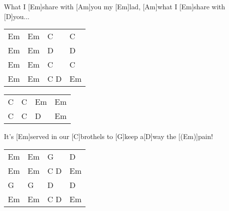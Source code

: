 \begin{guitar}
	[Am]What I [Em]share with [Am]you my [Em]lad, [Am]what I [Em]share with [D]you...
	
	{\footnotesize\begin{tabular}{|l|l|l|l|}
			Em & Em & C & C \\
			Em & Em & D & D \\
			Em & Em & C & C \\
			Em & Em & C D & Em 
	\end{tabular}} 

	{\footnotesize\begin{tabular}{|l|l|l|l|}
			C & C & Em & Em \\
			C & C & D & Em
	\end{tabular}} 
	
	\begin{highlightbar}
	 
	It's [Em]served in our [C]brothels to [G]keep a[D]way the [(Em)]pain! 
	\end{highlightbar}
	
	{\footnotesize\begin{tabular}{|l|l|l|l|}
			Em & Em & G & D \\
			Em & Em & C D & Em\\
			G & G & D & D\\
			Em & Em & C D & Em 
	\end{tabular}}
\end{guitar}
